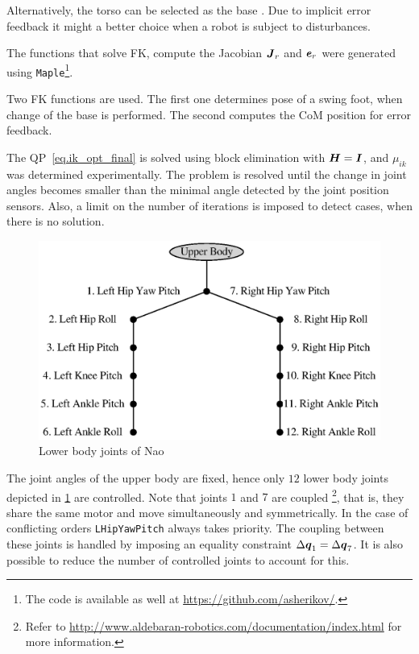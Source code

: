 Alternatively, the torso can be selected as the base \cite{NaoWalk}. Due to implicit
error feedback it might a better choice when a robot is subject to disturbances.

The functions that solve \ac{FK}, compute the Jacobian $\mbox{\boldmath $J$}_r$ and $\mbox{\boldmath $e$}_r$
were generated using \verb|Maple|\footnote{The code is available as well 
at \url{https://github.com/asherikov/}.}. 

Two \ac{FK} functions are used. The first one determines pose of a swing foot, when 
change of the base is performed. The second computes the \ac{CoM} position for error 
feedback.

The \ac{QP}~\eqref{eq.ik_opt_final} is solved using block elimination with $\mbox{\boldmath $H$} = 
\mbox{\boldmath $I$}$, and $\mu_{ik}$ was determined experimentally. The problem is resolved until 
the change in joint angles becomes smaller than the minimal angle detected by the 
joint position sensors. Also, a limit on the number of iterations is imposed to 
detect cases, when there is no solution.

\begin{figure}[ht]
    \centerline{%
    \includegraphics[scale=0.6]{Figures/nao_joints.eps}}
    \caption{Lower body joints of Nao}
    \label{fig.joints}
\end{figure}

The joint angles of the upper body are fixed, hence only $12$ lower body joints depicted 
in \cref{fig.joints} are controlled. Note that joints $1$ and $7$ are coupled
\footnote{Refer to \url{http://www.aldebaran-robotics.com/documentation/index.html} for
more information.}, that is, they share the same motor and move simultaneously and 
symmetrically. In the case of conflicting orders \verb|LHipYawPitch| always takes priority. 
The coupling between these joints is handled by imposing an equality constraint 
$\Delta\mbox{\boldmath $q$}_1 = \Delta\mbox{\boldmath $q$}_7$. It is also possible to reduce the number of controlled 
joints to account for this. 

